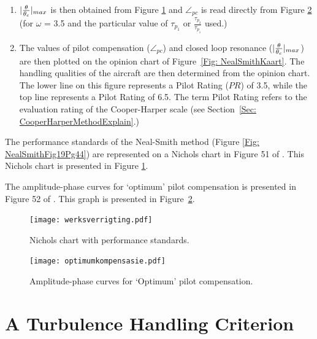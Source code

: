 \documentclass{report}
\begin{document}
\begin{enumerate}
	\item{$\arrowvert \frac{\theta}{\theta_c} \arrowvert _{max}$ is then obtained from Figure \ref{Fig: werksverrigting} and $\angle_{pc}$ is read directly from Figure \ref{Fig: optimumkompensasie} (for $\omega$ =  3.5 and the particular value of $\tau_{p_1}$ or $\frac{\tau_{p_2}}{\tau_{p_1}}$ used.)}
	\item{The values of pilot compensation ($\angle_{pc}$) and closed loop resonance ($\arrowvert \frac{\theta}{\theta_c} \arrowvert _{max}$) are then plotted on the opinion chart of \mbox{Figure \ref{Fig: NealSmithKaart}}.  The handling qualities of the aircraft are then determined from the opinion chart.  The lower line on this figure represents a Pilot Rating ($PR$) of 3.5, while the top line represents a Pilot Rating of 6.5.  The term Pilot Rating refers to the evaluation rating of the Cooper-Harper scale (see \mbox{Section \ref{Sec:  CooperHarperMethodExplain}}.)}
\end{enumerate}

The performance standards of the Neal-Smith method (Figure \ref{Fig: NealSmithFig19Pg44}) are represented on a Nichols chart in Figure 51 of \cite{NealSmith}.  This Nichols chart is presented in Figure \ref{Fig: werksverrigting}.

The amplitude-phase curves for `optimum' pilot compensation is presented in Figure 52 of \cite{NealSmith}.  This graph is presented in \mbox{Figure \ref{Fig: optimumkompensasie}}.

\begin{figure}[htb]
	\begin{center}
		\texttt{[image: werksverrigting.pdf]}
	\end{center}
	\caption{Nichols chart with performance standards.}
	\label{Fig: werksverrigting}
\end{figure}

\begin{figure}[htb]
	\begin{center}
		\texttt{[image: optimumkompensasie.pdf]}
	\end{center}
	\caption{Amplitude-phase curves for `Optimum' pilot compensation.  }
	\label{Fig: optimumkompensasie}
\end{figure}

\clearpage

\section{A Turbulence Handling Criterion}
\end{document}

